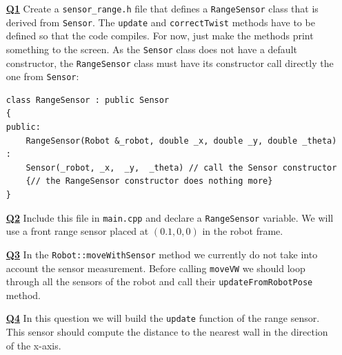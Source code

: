 \documentclass{ecnreport}
\begin{document}
\begin{itemize}
\medskip\item[\textbf{\underline{Q1}}] Create a \texttt{sensor\_range.h} file that defines a \texttt{RangeSensor} class that is derived from \texttt{Sensor}. The \texttt{update} and \texttt{correctTwist} methods have to be defined so that the code compiles. For now, just make the methods print something to the screen.
As the \texttt{Sensor} class does not have a default constructor, the \texttt{RangeSensor} class must have its constructor call directly the one from  \texttt{Sensor}:
\begin{center}\cppstyle
\begin{lstlisting}
class RangeSensor : public Sensor
{
public:
    RangeSensor(Robot &_robot, double _x, double _y, double _theta) :
	Sensor(_robot, _x,  _y,  _theta) // call the Sensor constructor
	{// the RangeSensor constructor does nothing more}
}    
\end{lstlisting}
\end{center}

\medskip\item[\textbf{\underline{Q2}}] Include this file in \texttt{main.cpp} and declare a \texttt{RangeSensor} variable.  We will use a front range sensor placed at $(0.1, 0,0)$ in the robot frame.

\medskip\item[\textbf{\underline{Q3}}] In the \texttt{Robot::moveWithSensor} method we currently do not take into account the sensor measurement. 
Before calling \texttt{moveVW} we should loop through all the sensors of the robot and call their \texttt{updateFromRobotPose} method.

\medskip\item[\textbf{\underline{Q4}}] In this question we will build the \texttt{update} function of the range sensor.
This sensor should compute the distance to the nearest wall in the direction of the x-axis.\\


\end{itemize}
\end{document}
